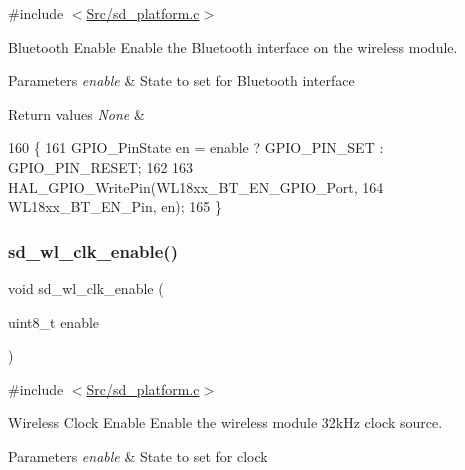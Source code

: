 {\ttfamily \#include $<$\mbox{\hyperlink{sd__platform_8c}{Src/sd\+\_\+platform.\+c}}$>$}



Bluetooth Enable Enable the Bluetooth interface on the wireless module. 


\begin{DoxyParams}{Parameters}
{\em enable} & State to set for Bluetooth interface \\
\hline
\end{DoxyParams}

\begin{DoxyRetVals}{Return values}
{\em None} & \\
\hline
\end{DoxyRetVals}

\begin{DoxyCode}
160 \{
161     GPIO\_PinState en = enable ? GPIO\_PIN\_SET : GPIO\_PIN\_RESET;
162     
163     HAL\_GPIO\_WritePin(WL18xx\_BT\_EN\_GPIO\_Port, 
164               WL18xx\_BT\_EN\_Pin, en);
165 \}
\end{DoxyCode}
\mbox{\label{group___s_d___platform___boot___config_ga5f6e21d454cec1f66957897103dafe85}} 
\subsubsection{\texorpdfstring{sd\+\_\+wl\+\_\+clk\+\_\+enable()}{sd\_wl\_clk\_enable()}}
{\footnotesize\ttfamily void sd\+\_\+wl\+\_\+clk\+\_\+enable (\begin{DoxyParamCaption}\item[{uint8\+\_\+t}]{enable }\end{DoxyParamCaption})}



{\ttfamily \#include $<$\mbox{\hyperlink{sd__platform_8c}{Src/sd\+\_\+platform.\+c}}$>$}



Wireless Clock Enable Enable the wireless module 32k\+Hz clock source. 


\begin{DoxyParams}{Parameters}
{\em enable} & State to set for clock \\
\hline
\end{DoxyParams}

